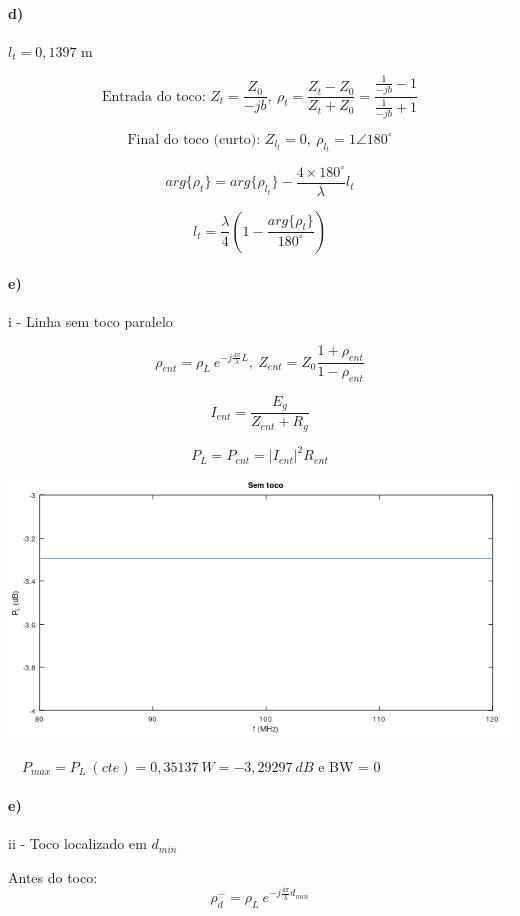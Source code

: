 \documentclass[12pt,a4paper]{article}
\begin{document}
\paragraph{d)}

$l_t = 0,1397$ m

$$\text{Entrada do toco: } Z_t = \frac{Z_0}{-jb}, \ \rho_t = \frac{Z_t - Z_0}{Z_t + Z_0} = \frac{\frac{1}{-jb} - 1}{\frac{1}{-jb} + 1}$$

$$\text{Final do toco (curto): } Z_{l_t} = 0, \ \rho_{l_t} = 1\angle 180^\circ$$

$$arg\{\rho_t\} = arg\{\rho_{l_t}\} -\frac{4\times 180^\circ}{\lambda}l_t$$

$$l_t = \frac{\lambda}{4}(1 - \frac{arg\{\rho_t\}}{180^\circ})$$

\paragraph{e)} i - Linha sem toco paralelo

$$\rho_{ent}=\rho_L\ e^{-j\frac{4\pi}{\lambda}L}, \ Z_{ent}=Z_0\frac{1+\rho_{ent}}{1-\rho_{ent}}$$

$$I_{ent}=\frac{E_g}{Z_{ent}+R_g}$$

$$P_L=P_{ent}=|I_{ent}|^2R_{ent}$$

\begin{center}
    \includegraphics[scale=0.65]{e i.png}
\end{center}

\ \ $P_{max}=P_L\ (cte) =0,35137\ W=-3,29297\ dB$ e BW = 0

\paragraph{e)} ii - Toco localizado em $d_{min}$

Antes do toco:
$$\rho_d^-=\rho_L\ e^{-j\frac{4\pi}{\lambda}d_{min}}$$
\end{document}
